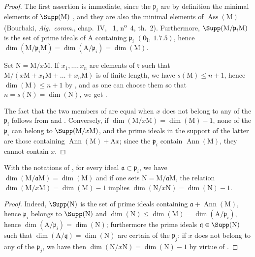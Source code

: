 \begin{proof}
The first assertion is immediate, since the $\mathfrak{p}_i$ are by definition the minimal elements of $\Supp(\mathrm{M})$ , and they are also the minimal elements of $\operatorname{Ass}(\mathrm{M})$ (Bourbaki, \emph{Alg.~comm.}, chap.~IV, \textsection~1, n\textsuperscript{o}~4, th.~2).
Furthermore, $\Supp(\mathrm{M}/\mathfrak{p}_i\mathrm{M})$ is the set of prime ideals of $\mathrm{A}$ containing $\mathfrak{p}_i$ $(\mathbf{0}_\mathrm{I},~1.7.5)$, hence $\dim(\mathrm{M}/\mathfrak{p}_i\mathrm{M})=\dim(\mathrm{A}/\mathfrak{p}_i)=\dim(\mathrm{M})$.

Set $\mathrm{N}=\mathrm{M}/x\mathrm{M}$.
If $x_1,\ldots,x_n$ are elements of $\mathfrak{r}$ such that $\mathrm{M}/(x\mathrm{M}+x_1\mathrm{M}+\ldots+x_n\mathrm{M})$ is of finite length, we have $s(\mathrm{M})\leq n+1$, hence $\dim(\mathrm{M})\leq n+1$ by , and as one can choose them so that $n=s(\mathrm{N})=\dim(\mathrm{N})$, we get .

The fact that the two members of  are equal when $x$ does not belong to any of the $\mathfrak{p}_i$ follows from  and .
Conversely, if  $\dim(\mathrm{M}/x\mathrm{M})=\dim(\mathrm{M})-1$, none of the $\mathfrak{p}_i$ can belong to $\Supp(\mathrm{M}/x\mathrm{M})$, and the prime ideals in the support of the latter are those containing $\operatorname{Ann}(\mathrm{M})+\mathrm{A}x$; since the $\mathfrak{p}_i$ contain $\operatorname{Ann}(\mathrm{M})$, they cannot contain $x$.
\end{proof}

\begin{corollary}[16.3.5]
\label{0.16.3.5}
With the notations of , for every ideal $\mathfrak{a}\subset\mathfrak{p}_i$, we have $\dim(\mathrm{M}/\mathfrak{a}\mathrm{M})=\dim(\mathrm{M})$ and if one sets $\mathrm{N}=\mathrm{M}/\mathfrak{a}\mathrm{M}$, the relation $\dim(\mathrm{M}/x\mathrm{M})=\dim(\mathrm{M})-1$ implies $\dim(\mathrm{N}/x\mathrm{N})=\dim(\mathrm{N})-1$.
\end{corollary}

\begin{proof}
Indeed, $\Supp(\mathrm{N})$ is the set of prime ideals containing $\mathfrak{a}+\operatorname{Ann}(\mathrm{M})$, hence $\mathfrak{p}_i$ belongs to $\Supp(\mathrm{N})$ and $\dim(\mathrm{N})\leq\dim(\mathrm{M})=\dim(\mathrm{A}/\mathfrak{p}_i)$, hence $\dim(\mathrm{A}/\mathfrak{p}_i)=\dim(\mathrm{N})$; furthermore the prime ideals $\mathfrak{q}\in\Supp(\mathrm{N})$ such that $\dim(\mathrm{A}/\mathfrak{q})=\dim(\mathrm{N})$ are certain of the $\mathfrak{p}_j$; if $x$ does not belong to any of the $\mathfrak{p}_j$, we have then $\dim(\mathrm{N}/x\mathrm{N})=\dim(\mathrm{N})-1$ by virtue of .
\end{proof}

